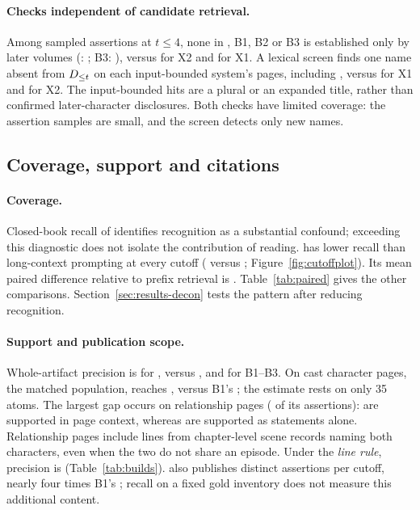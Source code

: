 \paragraph{Checks independent of candidate retrieval.}
Among sampled assertions at $t\le4$, none in \sys, B1, B2 or B3 is established only by later
volumes (\sys: ; B3: ), versus  for X2
and  for X1. A lexical screen finds one name absent from $D_{\le t}$ on each
input-bounded system's pages, including \sys, versus  for X1 and
 for X2. The input-bounded hits are a plural or an expanded title,
rather than confirmed later-character disclosures. Both checks have limited coverage:
the assertion samples are small, and the screen detects only new names.

\subsection{Coverage, support and citations}
\label{sec:results-quality}
\paragraph{Coverage.}
Closed-book recall of  identifies recognition as a substantial
confound; exceeding this diagnostic does not isolate the contribution of reading.
\sys has lower recall than long-context prompting at every cutoff
( versus ; Figure~\ref{fig:cutoffplot}).
Its mean paired difference relative to prefix retrieval is
. Table~\ref{tab:paired} gives the other comparisons.
\ifnwdecon Section~\ref{sec:results-decon} tests the pattern after reducing recognition.\fi{}

\paragraph{Support and publication scope.}
Whole-artifact precision is  for \sys, versus
,  and  for B1--B3.
On cast character pages, the matched population, \sys reaches ,
versus B1's ; the \sys estimate rests on only 35 atoms.
The largest gap occurs on relationship pages ( of its
assertions):  are supported in page context, whereas
 are supported as statements alone. Relationship pages include
lines from chapter-level scene records naming both characters, even when the two do
not share an episode. Under the \emph{line rule}, precision is 
(Table~\ref{tab:builds}). \sys also publishes  distinct assertions per
cutoff, nearly four times B1's ; recall on a fixed gold inventory
does not measure this additional content.


